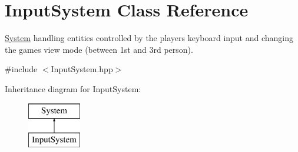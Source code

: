 \hypertarget{class_input_system}{}\section{Input\+System Class Reference}
\label{class_input_system}


\hyperlink{class_system}{System} handling entities controlled by the player\textquotesingle{}s keyboard input and changing the game\textquotesingle{}s view mode (between 1st and 3rd person).  




{\ttfamily \#include $<$Input\+System.\+hpp$>$}

Inheritance diagram for Input\+System\+:\begin{figure}[H]
\begin{center}
\leavevmode
\includegraphics[height=2.000000cm]{class_input_system}
\end{center}
\end{figure}
